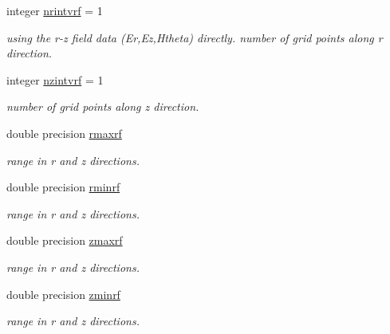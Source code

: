 \textbf{ }\par
\begin{DoxyCompactItemize}
\item 
integer \mbox{\hyperlink{namespacedataclass_a3b9a2feb5ab8139d532626cad00a9769}{nrintvrf}} = 1
\begin{DoxyCompactList}\small\item\em using the r-\/z field data (Er,Ez,Htheta) directly. number of grid points along r direction. \end{DoxyCompactList}\item 
integer \mbox{\hyperlink{namespacedataclass_a7dee8b652907c73253c32891a2a08514}{nzintvrf}} = 1
\begin{DoxyCompactList}\small\item\em number of grid points along z direction. \end{DoxyCompactList}\end{DoxyCompactItemize}

\textbf{ }\par
\begin{DoxyCompactItemize}
\item 
double precision \mbox{\hyperlink{namespacedataclass_a8ea08da279b20aa500095cba377a2de2}{rmaxrf}}
\begin{DoxyCompactList}\small\item\em range in r and z directions. \end{DoxyCompactList}\item 
double precision \mbox{\hyperlink{namespacedataclass_aae1944e971e5c71db5d8f21afceb0935}{rminrf}}
\begin{DoxyCompactList}\small\item\em range in r and z directions. \end{DoxyCompactList}\item 
double precision \mbox{\hyperlink{namespacedataclass_a4646788256b1b461413c546d6df8ee88}{zmaxrf}}
\begin{DoxyCompactList}\small\item\em range in r and z directions. \end{DoxyCompactList}\item 
double precision \mbox{\hyperlink{namespacedataclass_a24985c63a3d2c04ccb2cf299eff0c626}{zminrf}}
\begin{DoxyCompactList}\small\item\em range in r and z directions. \end{DoxyCompactList}\end{DoxyCompactItemize}

